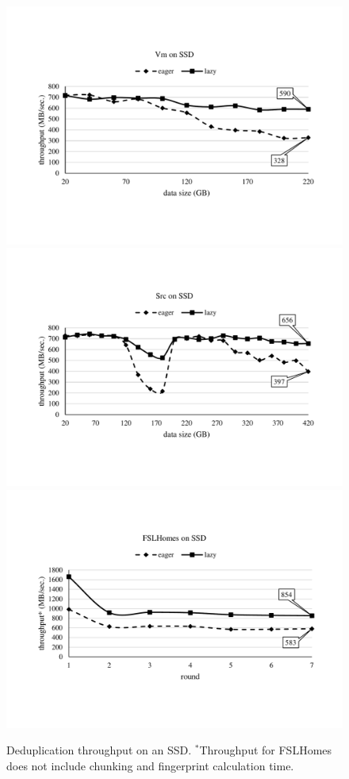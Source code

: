 \documentclass[prodmode,acmtecs]{acmsmall}
\begin{document}
\begin{figure}[htp]
\centering

\includegraphics[width=0.8\columnwidth]{overall-vm}
\\[0.5em]

\includegraphics[width=0.8\columnwidth]{overall-src}
\\[0.5em]

\includegraphics[width=0.8\columnwidth]{overall-home}
\caption{Deduplication throughput on an SSD. $^*$Throughput for FSLHomes does not include chunking and fingerprint calculation time.}
\label{fig:overall-SSD}
\end{figure}
\end{document}

